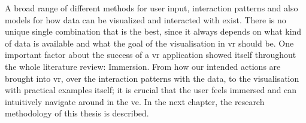 A broad range of different methods for user input, interaction patterns and also models for how data can be visualized and interacted with exist. There is no unique single combination that is the best, since it always depends on what kind of data is available and what the goal of the visualisation in \gls{vr} should be. One important factor about the success of a \gls{vr} application showed itself throughout the whole literature review: Immersion. From how our intended actions are brought into \gls{vr}, over the interaction patterns with the data, to the visualisation with practical examples itself; it is crucial that the user feels immersed and can intuitively navigate around in the \gls{ve}. \newline
In the next chapter, the research methodology of this thesis is described.
